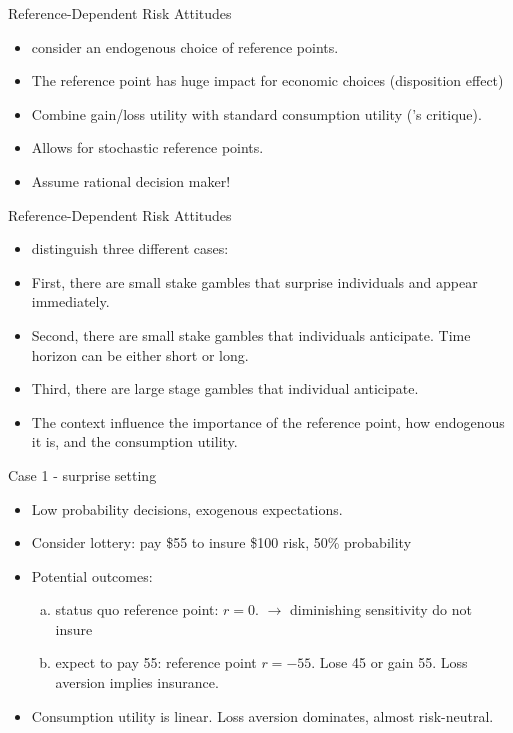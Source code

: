 \documentclass[11pt, aspectratio=169]{beamer}
\begin{document}
\begin{frame}{Reference-Dependent Risk Attitudes}
    \begin{itemize}
         \item \citet{KoeszegiRabin2007} consider an endogenous choice of reference points.\medskip
        \item The reference point has huge impact for economic choices (disposition effect)\medskip
        \item Combine gain/loss utility with standard consumption utility (\citet{Rabin2000}'s critique).\medskip
            \item Allows for stochastic reference points.\medskip
            \item Assume rational decision maker!\medskip
        \end{itemize}
\end{frame}

\begin{frame}{Reference-Dependent Risk Attitudes}
    \begin{itemize}
            \item \citet{KoeszegiRabin2007} distinguish three different cases:\medskip
            \item First, there are small stake gambles that surprise individuals and appear immediately.\medskip
            \item Second, there are small stake gambles that individuals anticipate. Time horizon can be either short or long.\medskip
           \item Third, there are large stage gambles that individual anticipate.\medskip
           \item The context influence the importance of the reference point, how endogenous it is, and the consumption utility.\medskip
                    \end{itemize}
\end{frame}

\begin{frame}{Case 1 - surprise setting}
    \begin{itemize}
        \item Low probability decisions, exogenous expectations.\medskip
        \item Consider lottery: pay \$55 to insure \$100 risk, 50\% probability\medskip
        \item Potential outcomes:\medskip
        \begin{enumerate}[(a)]
            \item status quo reference point: $r = 0$. $\rightarrow$ diminishing sensitivity do not insure\medskip
            \item expect to pay 55: reference point $r = -55$. Lose 45  or gain 55. Loss aversion implies  insurance.\medskip
        \end{enumerate}
        \item Consumption utility is linear. Loss aversion dominates, almost risk-neutral.\medskip
        \end{itemize}
   \end{frame}
\end{document}
